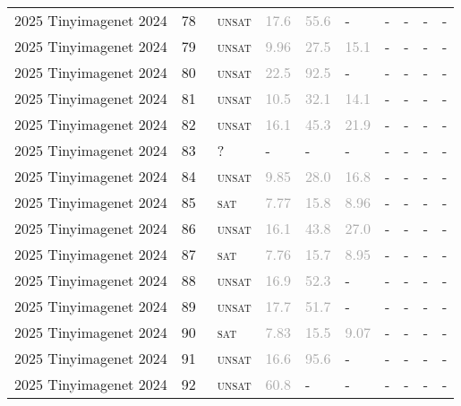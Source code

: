 \begin{center}
{\begin{longtable}{@{}llllllllll@{}}
2025 Tinyimagenet 2024 & 78 & ~\textsc{unsat} & \textcolor{darkgray}{17.6} & \textcolor{darkgray}{55.6} & - & - & - & - & - \\
2025 Tinyimagenet 2024 & 79 & ~\textsc{unsat} & \textcolor{darkgray}{9.96} & \textcolor{darkgray}{27.5} & \textcolor{darkgray}{15.1} & - & - & - & - \\
2025 Tinyimagenet 2024 & 80 & ~\textsc{unsat} & \textcolor{darkgray}{22.5} & \textcolor{darkgray}{92.5} & - & - & - & - & - \\
2025 Tinyimagenet 2024 & 81 & ~\textsc{unsat} & \textcolor{darkgray}{10.5} & \textcolor{darkgray}{32.1} & \textcolor{darkgray}{14.1} & - & - & - & - \\
2025 Tinyimagenet 2024 & 82 & ~\textsc{unsat} & \textcolor{darkgray}{16.1} & \textcolor{darkgray}{45.3} & \textcolor{darkgray}{21.9} & - & - & - & - \\
2025 Tinyimagenet 2024 & 83 & ~? & - & - & - & - & - & - & - \\
2025 Tinyimagenet 2024 & 84 & ~\textsc{unsat} & \textcolor{darkgray}{9.85} & \textcolor{darkgray}{28.0} & \textcolor{darkgray}{16.8} & - & - & - & - \\
2025 Tinyimagenet 2024 & 85 & ~\textsc{sat} & \textcolor{darkgray}{7.77} & \textcolor{darkgray}{15.8} & \textcolor{darkgray}{8.96} & - & - & - & - \\
2025 Tinyimagenet 2024 & 86 & ~\textsc{unsat} & \textcolor{darkgray}{16.1} & \textcolor{darkgray}{43.8} & \textcolor{darkgray}{27.0} & - & - & - & - \\
2025 Tinyimagenet 2024 & 87 & ~\textsc{sat} & \textcolor{darkgray}{7.76} & \textcolor{darkgray}{15.7} & \textcolor{darkgray}{8.95} & - & - & - & - \\
2025 Tinyimagenet 2024 & 88 & ~\textsc{unsat} & \textcolor{darkgray}{16.9} & \textcolor{darkgray}{52.3} & - & - & - & - & - \\
2025 Tinyimagenet 2024 & 89 & ~\textsc{unsat} & \textcolor{darkgray}{17.7} & \textcolor{darkgray}{51.7} & - & - & - & - & - \\
2025 Tinyimagenet 2024 & 90 & ~\textsc{sat} & \textcolor{darkgray}{7.83} & \textcolor{darkgray}{15.5} & \textcolor{darkgray}{9.07} & - & - & - & - \\
2025 Tinyimagenet 2024 & 91 & ~\textsc{unsat} & \textcolor{darkgray}{16.6} & \textcolor{darkgray}{95.6} & - & - & - & - & - \\
2025 Tinyimagenet 2024 & 92 & ~\textsc{unsat} & \textcolor{darkgray}{60.8} & - & - & - & - & - & - \\

\end{longtable}}
\end{center}
